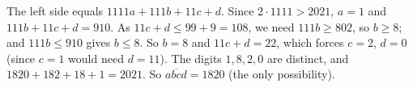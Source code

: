 The left side equals $1111a+111b+11c+d$. Since $2\cdot1111>2021$, $a=1$ and $111b+11c+d=910$. As $11c+d\le99+9=108$, we need $111b\ge802$, so $b\ge8$; and $111b\le910$ gives $b\le8$. So $b=8$ and $11c+d=22$, which forces $c=2$, $d=0$ (since $c=1$ would need $d=11$). The digits $1,8,2,0$ are distinct, and $1820+182+18+1=2021$. So $\overline{abcd}=\boxed{1820}$ (the only possibility).
